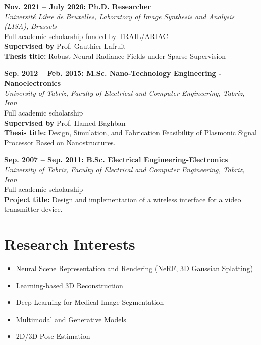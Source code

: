 \documentclass[11pt,a4paper]{article}
\newcommand{\blueitem}[1]{\textcolor{subtitleblue}{\textbf{#1}}}
\begin{document}
\blueitem{Nov. 2021 -- July 2026: Ph.D. Researcher} \\
\textit{Université Libre de Bruxelles, Laboratory of Image Synthesis and Analysis (LISA), Brussels} \\
Full academic scholarship funded by TRAIL/ARIAC\\
\textbf{Supervised by} Prof. Gauthier Lafruit \\
\textbf{Thesis title:} Robust Neural Radiance Fields under Sparse Supervision \\

\vspace{0.3em}

\blueitem{Sep. 2012 -- Feb. 2015: M.Sc. Nano-Technology Engineering - Nanoelectronics}\\
\textit{University of Tabriz, Faculty of Electrical and Computer Engineering, Tabriz, Iran} \\
Full academic scholarship\\
\textbf{Supervised by} Prof. Hamed Baghban \\
\textbf{Thesis title:} Design, Simulation, and Fabrication Feasibility of Plasmonic Signal Processor Based on Nanostructures.

\vspace{0.3em}
\blueitem{Sep. 2007 -- Sep. 2011: B.Sc. Electrical Engineering-Electronics} \\
\textit{University of Tabriz, Faculty of Electrical and Computer Engineering, Tabriz, Iran} \\
Full academic scholarship\\
\textbf{Project title:} Design and implementation of a wireless interface for a video transmitter device.

\vspace{1em}

\section*{Research Interests}
\begin{itemize}
    \item Neural Scene Representation and Rendering (NeRF, 3D Gaussian Splatting)
    \item Learning-based 3D Reconstruction
    \item Deep Learning for Medical Image Segmentation
    \item Multimodal and Generative Models
    \item 2D/3D Pose Estimation
\end{itemize}
\end{document}
